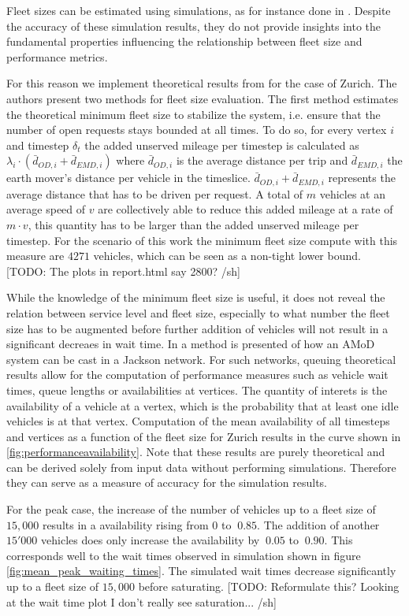 Fleet sizes can be estimated using simulations, as for instance done in
\citep{bischoff2016simulation}. Despite the accuracy of these
simulation results, they do not provide insights into the fundamental
properties influencing the relationship between fleet size and performance metrics.

For this reason we implement theoretical results from \citep{spieser2014toward}
for the case of Zurich. The authors present two methods for fleet size evaluation.
The first method estimates the theoretical minimum fleet size to stabilize
the system, i.e. ensure that the number of open requests stays bounded at
all times. To do so, for every vertex $i$ and timestep $\delta_t$ the added
unserved mileage per timestep is calculated as
$\lambda_i \cdot ( \bar{d}_{OD,i}  + \bar{d}_{EMD,i})$ where $\bar{d}_{OD,i}$
is the average distance per trip and  $\bar{d}_{EMD,i}$ the earth mover's
distance per vehicle in the timeslice. $\bar{d}_{OD,i}  + \bar{d}_{EMD,i}$
represents the average distance that has to be driven per request. A total of
$m$ vehicles at an average speed of $v$ are collectively able to reduce this
 added mileage at a rate of $m \cdot v$, this quantity has to be larger than the
 added unserved mileage per timestep. For the scenario of this work the
 minimum fleet size compute with this measure are $4271$ vehicles, which
 can be seen as a non-tight lower bound. [TODO: The plots in report.html say
 2800? /sh]

While the knowledge of the minimum fleet size is useful, it does not reveal
the relation between service level and fleet size, especially to what number
the fleet size has to be augmented before further addition of vehicles will
not result in a significant decreaes in wait time. In \citep{zhang2016control}
 a method is presented of how an AMoD system can be cast in a Jackson network.
 For such networks, queuing theoretical results allow for the computation of
 performance measures such as vehicle wait times, queue lengths or
 availabilities at vertices. The quantity of interets is the availability
 of a vehicle at a vertex, which is the probability that at least one idle
 vehicles is at that vertex. Computation of the mean availability of all
 timesteps and vertices as a function of the fleet size for Zurich results
 in the curve shown in \ref{fig:performanceavailability}. Note that these results
 are purely theoretical and can be derived solely from input data without performing simulations.
 Therefore they can serve as a measure of accuracy for the simulation results.

For the peak case, the increase of the number of vehicles up to a fleet size of $15,000$ results
in a availability rising from $0$ to $~0.85$. The addition of another $15'000$ vehicles does only
increase the availability by $~0.05$ to $~0.90$. This corresponds well to the wait times observed
 in simulation shown in figure \ref{fig:mean_peak_waiting_times}. The simulated wait times
 decrease significantly up to a fleet size of $15,000$ before saturating.
 [TODO: Reformulate this? Looking at the wait time plot I don't really see saturation... /sh]
